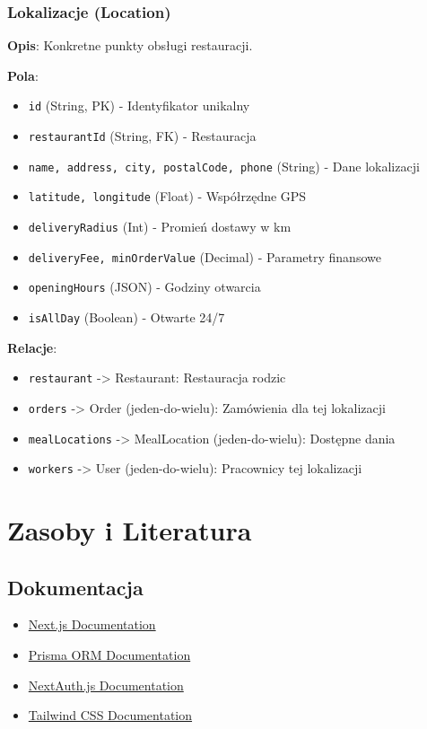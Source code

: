 ﻿\documentclass[12pt,a4paper,utf-8]{article}
\begin{document}
\subsubsection{Lokalizacje (Location)}

\textbf{Opis}: Konkretne punkty obsługi restauracji.

\textbf{Pola}:
\begin{itemize}
    \item \texttt{id} (String, PK) - Identyfikator unikalny
    \item \texttt{restaurantId} (String, FK) - Restauracja
    \item \texttt{name, address, city, postalCode, phone} (String) - Dane lokalizacji
    \item \texttt{latitude, longitude} (Float) - Współrzędne GPS
    \item \texttt{deliveryRadius} (Int) - Promień dostawy w km
    \item \texttt{deliveryFee, minOrderValue} (Decimal) - Parametry finansowe
    \item \texttt{openingHours} (JSON) - Godziny otwarcia
    \item \texttt{isAllDay} (Boolean) - Otwarte 24/7
\end{itemize}

\textbf{Relacje}:
\begin{itemize}
    \item \texttt{restaurant} -> Restaurant: Restauracja rodzic
    \item \texttt{orders} -> Order (jeden-do-wielu): Zamówienia dla tej lokalizacji
    \item \texttt{mealLocations} -> MealLocation (jeden-do-wielu): Dostępne dania
    \item \texttt{workers} -> User (jeden-do-wielu): Pracownicy tej lokalizacji
\end{itemize}

\newpage

\section{Zasoby i Literatura}

\subsection{Dokumentacja}

\begin{itemize}
    \item \href{https://nextjs.org/}{Next.js Documentation}
    \item \href{https://www.prisma.io/}{Prisma ORM Documentation}
    \item \href{https://next-auth.js.org/}{NextAuth.js Documentation}
    \item \href{https://tailwindcss.com/}{Tailwind CSS Documentation}
\end{itemize}
\end{document}
